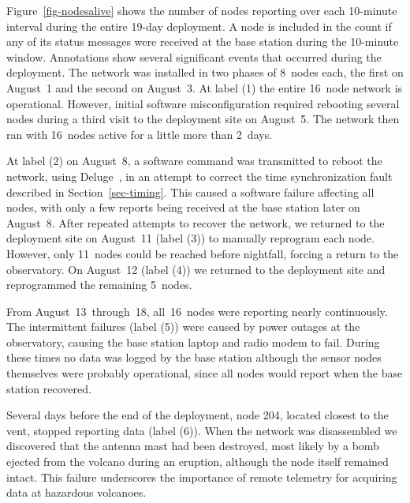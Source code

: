 Figure~\ref{fig-nodesalive} shows the number of nodes reporting over each
10-minute interval during the entire 19-day deployment. A node is included in
the count if any of its status messages were received at the base station
during the 10-minute window.  Annotations show several significant events
that occurred during the deployment. The network was installed in two phases
of 8~nodes each, the first on August~1 and the second on August~3.  At label
(1) the entire 16~node network is operational.  However, initial software
misconfiguration required rebooting several nodes during a third visit to
the deployment site on August~5.  The network then ran with 16~nodes active
for a little more than 2~days. 

At label (2) on August~8, a software command was transmitted to reboot the
network, using Deluge~\cite{deluge}, in an attempt to correct the
time synchronization fault described in Section~\ref{sec-timing}.
This caused a software failure affecting all nodes, 
with only a few reports being
received at the base station later on August~8. 
After repeated attempts to
recover the network, we returned to the deployment site on
August~11 (label (3)) to manually reprogram each node.  However, only
11~nodes could be reached before nightfall, forcing a return to the
observatory. On August~12 (label (4)) we returned to the
deployment site and reprogrammed the remaining 5~nodes. 

From August~13~through~18, all~16~nodes were reporting nearly continuously.
The intermittent failures (label (5)) were caused by power outages at the
observatory, causing the base station laptop and radio modem to fail. During
these times no data was logged by the base station although the sensor nodes
themselves were probably operational, since all nodes would report when the 
base station recovered.

Several days before the end of the deployment, node 204, located closest to
the vent, stopped reporting data (label (6)). When the network was
disassembled we discovered that the antenna mast had been destroyed, 
most likely by a bomb ejected from the volcano during an eruption, 
although the node itself remained intact. 
This failure underscores the importance of remote
telemetry for acquiring data at hazardous volcanoes.

